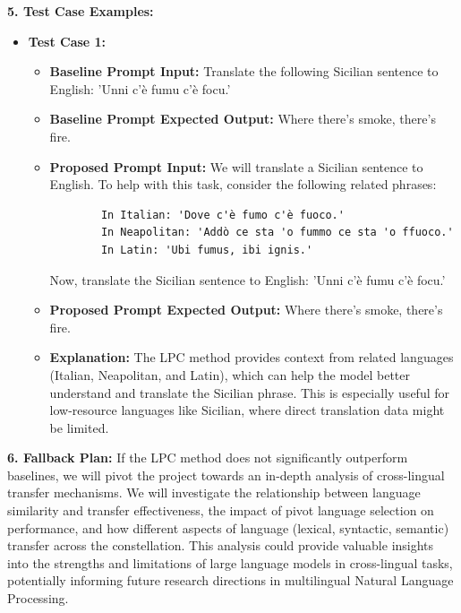 \begin{tcolorbox}[colback=blue!5!white,colframe=blue!75!black,title=\textbf{Linguistic Pivot Constellation (LPC): Enhancing Cross-Lingual Transfer for Low-Resource Languages and Dialects (Part 3)}]
    \textbf{5. Test Case Examples:}
    \begin{itemize}
        \item \textbf{Test Case 1:}
        \begin{itemize}
            \item \textbf{Baseline Prompt Input:} Translate the following Sicilian sentence to English: 'Unni c'è fumu c'è focu.'
            \item \textbf{Baseline Prompt Expected Output:} Where there's smoke, there's fire.
            \item \textbf{Proposed Prompt Input:} We will translate a Sicilian sentence to English. To help with this task, consider the following related phrases:
            \begin{verbatim}
        In Italian: 'Dove c'è fumo c'è fuoco.'
        In Neapolitan: 'Addò ce sta 'o fummo ce sta 'o ffuoco.'
        In Latin: 'Ubi fumus, ibi ignis.'
            \end{verbatim}
            Now, translate the Sicilian sentence to English: 'Unni c'è fumu c'è focu.'
            \item \textbf{Proposed Prompt Expected Output:} Where there's smoke, there's fire.
            \item \textbf{Explanation:} The LPC method provides context from related languages (Italian, Neapolitan, and Latin), which can help the model better understand and translate the Sicilian phrase. This is especially useful for low-resource languages like Sicilian, where direct translation data might be limited.
        \end{itemize}
    \end{itemize}

    \textbf{6. Fallback Plan:} If the LPC method does not significantly outperform baselines, we will pivot the project towards an in-depth analysis of cross-lingual transfer mechanisms. We will investigate the relationship between language similarity and transfer effectiveness, the impact of pivot language selection on performance, and how different aspects of language (lexical, syntactic, semantic) transfer across the constellation. This analysis could provide valuable insights into the strengths and limitations of large language models in cross-lingual tasks, potentially informing future research directions in multilingual Natural Language Processing.

\end{tcolorbox}


\newpage 

